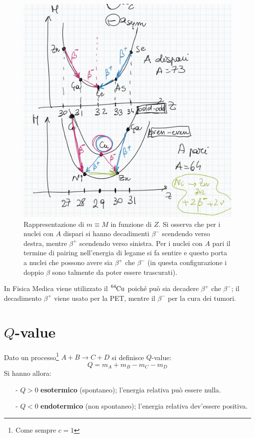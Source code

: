 \begin{figure}[!h]
    \centering
    \includegraphics[scale=0.3]{Immagini/MvsZ.png}
    \caption{Rappresentazione di $m\equiv M$ in funzione di $Z$. Si osserva che per i nuclei con $A$ dispari si hanno decadimenti $\beta^-$ scendendo verso destra, mentre $\beta^+$ scendendo verso sinistra. Per i nuclei con $A$ pari il termine di pairing nell'energia di legame si fa sentire e questo porta a nuclei che possono avere sia $\beta^+$ che $\beta^-$ (in questa configurazione i doppio $\beta$ sono talmente  da poter essere trascurati).}
    \label{MvsZ}
\end{figure}

\begin{curiosita}
In Fisica Medica viene utilizzato il $\ce{^64Cu}$ poiché può sia decadere $\beta^+$ che $\beta^-$; il decadimento $\beta^+$ viene usato per la PET, mentre il $\beta^-$ per la cura dei tumori.
\end{curiosita}

\section{$Q$-value}
Dato un processo\footnote{Come sempre $c=1$} $A+B\to C+D$ si definisce $Q$-value:
$$Q = m_A + m_B - m_C - m_D$$
Si hanno allora:
\begin{itemize}
    \item[-] $Q>0$ \textbf{esotermico} (spontaneo); l'energia relativa può essere nulla. 
    \item[-] $Q<0$ \textbf{endotermico} (non spontaneo); l'energia relativa dev'essere positiva.
\end{itemize}
\newpage

